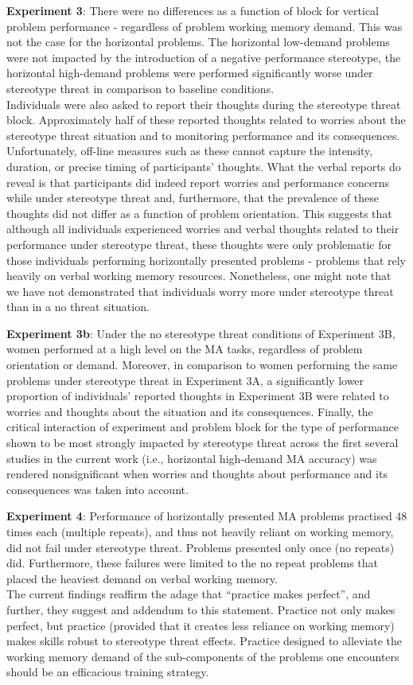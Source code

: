\documentclass[
  doc, a4paper]{apa7}
\begin{document}
\textbf{Experiment 3}:
There were no differences as a function of block for vertical problem performance - regardless of problem working memory demand. This was not the case for the horizontal problems. The horizontal low-demand problems were not impacted by the introduction of a negative performance stereotype, the horizontal high-demand problems were performed significantly worse under stereotype threat in comparison to baseline conditions.\\
Individuals were also asked to report their thoughts during the stereotype threat block. Approximately half of these reported thoughts related to worries about the stereotype threat situation and to monitoring performance and its consequences. Unfortunately, off-line measures such as these cannot capture the intensity, duration, or precise timing of participants' thoughts. What the verbal reports do reveal is that participants did indeed report worries and performance concerns while under stereotype threat and, furthermore, that the prevalence of these thoughts did not differ as a function of problem orientation. This suggests that although all individuals experienced worries and verbal thoughts related to their performance under stereotype threat, these thoughts were only problematic for those individuals performing horizontally presented problems - problems that rely heavily on verbal working memory resources. Nonetheless, one might note that we have not demonstrated that individuals worry more under stereotype threat than in a no threat situation.

\textbf{Experiment 3b}:
Under the no stereotype threat conditions of Experiment 3B, women performed at a high level on the MA tasks, regardless of problem orientation or demand. Moreover, in comparison to women performing the same problems under stereotype threat in Experiment 3A, a significantly lower proportion of individuals' reported thoughts in Experiment 3B were related to worries and thoughts about the situation and its consequences. Finally, the critical interaction of experiment and problem block for the type of performance shown to be most strongly impacted by stereotype threat across the first several studies in the current work (i.e., horizontal high-demand MA accuracy) was rendered nonsignificant when worries and thoughts about performance and its consequences was taken into account.

\textbf{Experiment 4}:
Performance of horizontally presented MA problems practised 48 times each (multiple repeats), and thus not heavily reliant on working memory, did not fail under stereotype threat. Problems presented only once (no repeats) did. Furthermore, these failures were limited to the no repeat problems that placed the heaviest demand on verbal working memory.\\
The current findings reaffirm the adage that ``practice makes perfect'', and further, they suggest and addendum to this statement. Practice not only makes perfect, but practice (provided that it creates less reliance on working memory) makes skills robust to stereotype threat effects. Practice designed to alleviate the working memory demand of the sub-components of the problems one encounters should be an efficacious training strategy.
\end{document}

